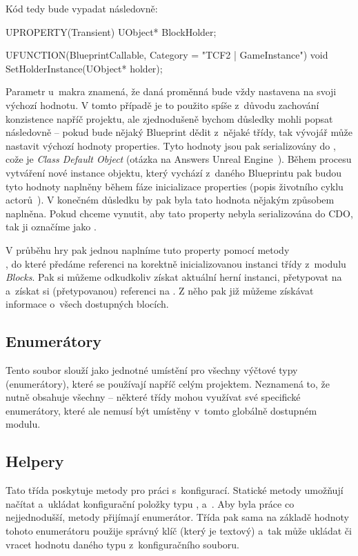 Kód tedy bude vypadat následovně:
\begin{code}
	UPROPERTY(Transient)
		UObject* BlockHolder;

	UFUNCTION(BlueprintCallable, Category = "TCF2 | GameInstance")
		void SetHolderInstance(UObject* holder);
\end{code}



 Parametr  u~makra  znamená, že daná proměnná bude vždy nastavena na svoji výchozí hodnotu. V tomto případě je to použito spíše z~důvodu zachování konzistence napříč projektu, ale zjednodušeně bychom důsledky mohli popsat následovně -- pokud bude nějaký Blueprint dědit z~nějaké \CPP{} třídy, tak vývojář může nastavit výchozí hodnoty properties. Tyto hodnoty jsou pak serializovány do \CDO{}, cože je \textit{Class Default Object} (otázka na Answers Unreal Engine~\citep{ue_cdo}). Během procesu vytváření nové instance objektu, který vychází z~daného Blueprintu pak budou tyto hodnoty naplněny během fáze inicializace properties (popis životního cyklu actorů~\citep{ue_actor_life}). V konečném důsledku by pak byla tato hodnota nějakým způsobem naplněna. Pokud chceme vynutit, aby tato property nebyla serializována do CDO, tak ji označíme jako .

V průběhu hry pak jednou naplníme tuto property pomocí metody\\ , do které předáme referenci na korektně inicializovanou instanci třídy  z~modulu \textit{Blocks}. Pak si můžeme odkudkoliv získat aktuální herní instanci, přetypovat na  a~získat si (přetypovanou) referenci na . Z něho pak již můžeme získávat informace o~všech dostupných blocích.

\subsection{Enumerátory}

Tento soubor slouží jako jednotné umístění pro všechny výčtové typy (enumerátory), které se používají napříč celým projektem. Neznamená to, že nutně obsahuje všechny -- některé třídy mohou využívat své specifické enumerátory, které ale nemusí být umístěny v~tomto globálně dostupném modulu.


\subsection{Helpery}

 Tato třída poskytuje metody pro práci s~konfigurací. Statické metody umožňují načítat a~ukládat konfigurační položky typu ,  a~.
Aby byla práce co nejjednodušší, metody přijímají enumerátor\linebreak[4]. Třída pak sama na základě hodnoty tohoto enumerátoru použije správný klíč (který je textový) a~tak může ukládat či vracet hodnotu daného typu z~konfiguračního souboru.